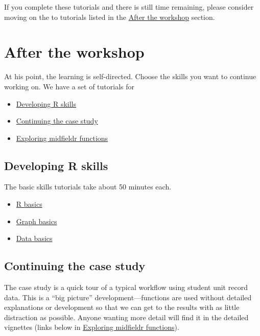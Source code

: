 \documentclass[
]{book}
\providecommand{\tightlist}{%
  \setlength{\itemsep}{0pt}\setlength{\parskip}{0pt}}
\begin{document}
If you complete these tutorials and there is still time remaining, please consider moving on the to tutorials listed in the \protect\hyperlink{after-the-workshop}{After the workshop} section.

\hypertarget{after-the-workshop}{%
\section{After the workshop}\label{after-the-workshop}}

At his point, the learning is self-directed. Choose the skills you want to continue working on. We have a set of tutorials for

\begin{itemize}
\tightlist
\item
  \protect\hyperlink{developing-r-skills}{Developing R skills}
\item
  \protect\hyperlink{continuing-the-case-study}{Continuing the case study}
\item
  \protect\hyperlink{exploring-midfieldr-functions}{Exploring midfieldr functions}
\end{itemize}

\hypertarget{developing-r-skills}{%
\subsection{Developing R skills}\label{developing-r-skills}}

The basic skills tutorials take about 50 minutes each.

\begin{itemize}
\tightlist
\item
  \protect\hyperlink{r-basics}{R basics}
\item
  \protect\hyperlink{graph-basics}{Graph basics}\\
\item
  \protect\hyperlink{data-basics}{Data basics}
\end{itemize}

\hypertarget{continuing-the-case-study}{%
\subsection{Continuing the case study}\label{continuing-the-case-study}}

The case study is a quick tour of a typical workflow using student unit record data. This is a ``big picture'' development---functions are used without detailed explanations or development so that we can get to the results with as little distraction as possible. Anyone wanting more detail will find it in the detailed vignettes (links below in \protect\hyperlink{exploring-midfieldr-functions}{Exploring midfieldr functions}).
\end{document}
